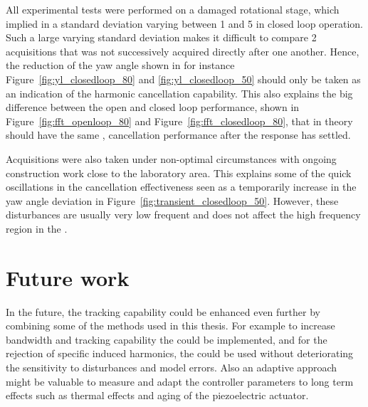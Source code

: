 %
%


All experimental tests were performed on a damaged rotational stage, which implied in a standard deviation varying between \unit{1}{\micro\radian} and \unit{5}{\micro\radian} in closed loop operation. Such a large varying standard deviation makes it difficult to compare 2 acquisitions that was not successively acquired directly after one another. Hence, the reduction of the yaw angle shown in for instance Figure~\ref{fig:yl_closedloop_80} and \ref{fig:yl_closedloop_50} should only be taken as an indication of the harmonic cancellation capability. This also explains the big difference between the open and closed loop performance, shown in Figure~\ref{fig:fft_openloop_80} and Figure~\ref{fig:fft_closedloop_80}, that in theory should have the same , cancellation performance after the response has settled.

Acquisitions were also taken under non-optimal circumstances with ongoing construction work close to the laboratory area. This explains some of the quick oscillations in the cancellation effectiveness seen as a temporarily increase in the yaw angle deviation in Figure~\ref{fig:transient_closedloop_50}. However, these disturbances are usually very low frequent and does not affect the high frequency region in the \abbrFFT.

%
%

\section{Future work}
In the future, the tracking capability could be enhanced even further by combining some of the methods used in this thesis. For example to increase bandwidth and tracking capability the \abbrIRC could be implemented, and for the rejection of specific induced harmonics, the \abbrRFDC could be used without deteriorating the sensitivity to disturbances and model errors. Also an adaptive approach might be valuable to measure and adapt the controller parameters to long term effects such as thermal effects and aging of the piezoelectric actuator.

